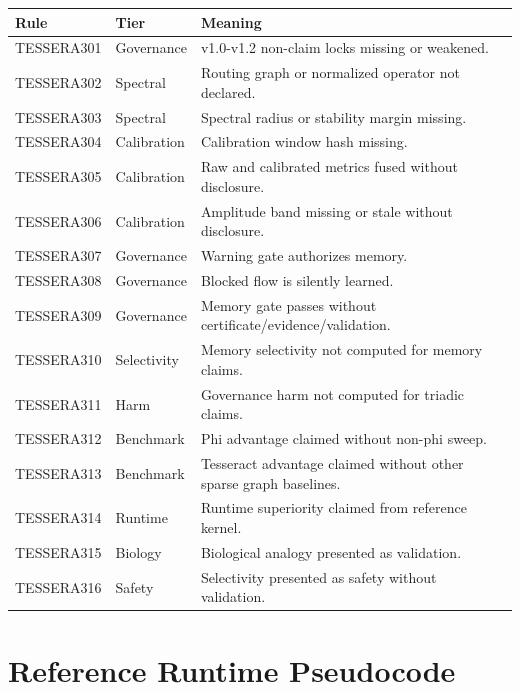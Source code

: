 \documentclass[12pt]{article}
\begin{document}
\begin{longtable}{p{}p{}p{}}
\toprule
\textbf{Rule} & \textbf{Tier} & \textbf{Meaning} \\
\midrule
TESSERA301 & Governance & v1.0-v1.2 non-claim locks missing or weakened. \\
TESSERA302 & Spectral & Routing graph or normalized operator not declared. \\
TESSERA303 & Spectral & Spectral radius or stability margin missing. \\
TESSERA304 & Calibration & Calibration window hash missing. \\
TESSERA305 & Calibration & Raw and calibrated metrics fused without disclosure. \\
TESSERA306 & Calibration & Amplitude band missing or stale without disclosure. \\
TESSERA307 & Governance & Warning gate authorizes memory. \\
TESSERA308 & Governance & Blocked flow is silently learned. \\
TESSERA309 & Governance & Memory gate passes without certificate/evidence/validation. \\
TESSERA310 & Selectivity & Memory selectivity not computed for memory claims. \\
TESSERA311 & Harm & Governance harm not computed for triadic claims. \\
TESSERA312 & Benchmark & Phi advantage claimed without non-phi sweep. \\
TESSERA313 & Benchmark & Tesseract advantage claimed without other sparse graph baselines. \\
TESSERA314 & Runtime & Runtime superiority claimed from reference kernel. \\
TESSERA315 & Biology & Biological analogy presented as validation. \\
TESSERA316 & Safety & Selectivity presented as safety without validation. \\
\bottomrule
\end{longtable}

\section{Reference Runtime Pseudocode}
\end{document}
